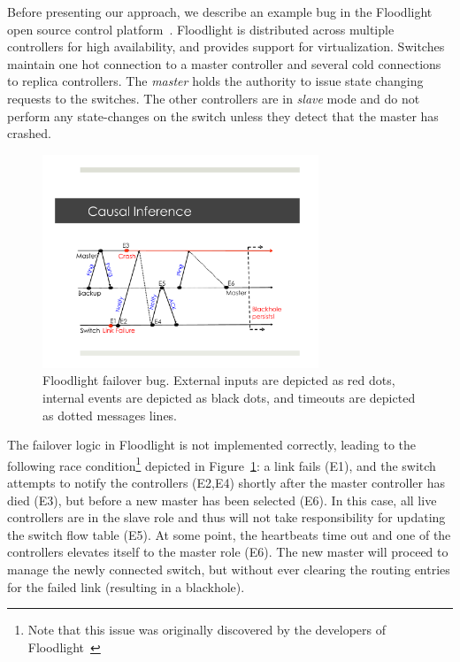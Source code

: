 

Before presenting our approach, we describe an example bug in the Floodlight
open source control platform~\cite{floodlight}. Floodlight is distributed across
multiple controllers for high availability, and provides support for
virtualization. Switches maintain one hot connection to a master controller and
several cold connections to replica controllers. The \emph{master} holds the
authority to issue state changing requests to the switches. The other
controllers are in \emph{slave} mode and do not perform any state-changes on the
switch unless they detect that the master has crashed.

\begin{figure}[t]
    \includegraphics[width=3.25in]{../diagrams/case_study/example_bug.pdf}
    \caption[]{\label{fig:example} Floodlight failover bug. External inputs
               are depicted as red dots, internal events are depicted as black
               dots, and timeouts are depicted as dotted messages lines.}
\end{figure}

The failover logic in Floodlight is not implemented correctly, leading to the
following race condition\footnote{Note that this issue was
originally discovered by the developers of Floodlight~\cite{floodlight_bug}} depicted in
Figure~\ref{fig:example}:
a link fails (E1), and the switch attempts to notify the controllers (E2,E4) shortly after the master
controller has died (E3), but before a new master has been selected (E6). In this case, all live controllers are in
the slave role and thus will not take responsibility for updating the switch
flow table (E5). At some point, the heartbeats time out and one of the controllers
elevates itself to the master role (E6). The new master will proceed to manage
the newly connected switch, but without ever clearing the routing entries for
the failed link (resulting in a blackhole).

